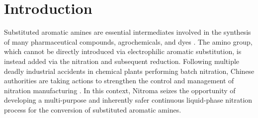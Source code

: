 \section{Introduction}
\label{sec:introduction}

Substituted aromatic amines are essential intermediates involved in the synthesis of many pharmaceutical compounds, agrochemicals, and dyes \cite{vogt_amines_2000}. The amino group, which cannot be directly introduced via electrophilic aromatic substitution, is instead added via the nitration and subsequent reduction.
Following multiple deadly industrial accidents in chemical plants performing batch nitration, Chinese authorities are taking actions to strengthen the control and management of nitration manufacturing \cite{noauthor_china_2019}.
In this context, Nitroma seizes the opportunity of developing a multi-purpose and inherently safer continuous liquid-phase nitration process for the conversion of substituted aromatic  amines. 

\begin{comment}
Substituted aromatic amines are essential intermediates involved in the synthesis of many pharmaceutical compounds, agrochemicals, and dyes \cite{vogt_amines_2000}. The easy replacement of the amino group by other functional groups makes them very attractive versatile intermediates. The amino group, which cannot be directly introduced via electrophilic aromatic substitution, is instead added via the nitration of the aromatic ring, followed by reduction.

Following multiple deadly industrial accidents in chemical plants performing batch nitration, especially the 2019 Xiangshui chemical plant explosion, Chinese authorities are taking actions to strengthen the control and management of nitration manufacturing. Inspections and in-depth risk assessments are expected to be conducted to ensure compliance of the plants with the regulations on dangerous chemicals \cite{noauthor_china_2019}.

In this context, Nitroma seizes the opportunity of developing a multi-purpose and continuous liquid phase nitration process for the conversion of substituted aromatics to their respective nitrates and subsequently to their amines. 
\end{comment}